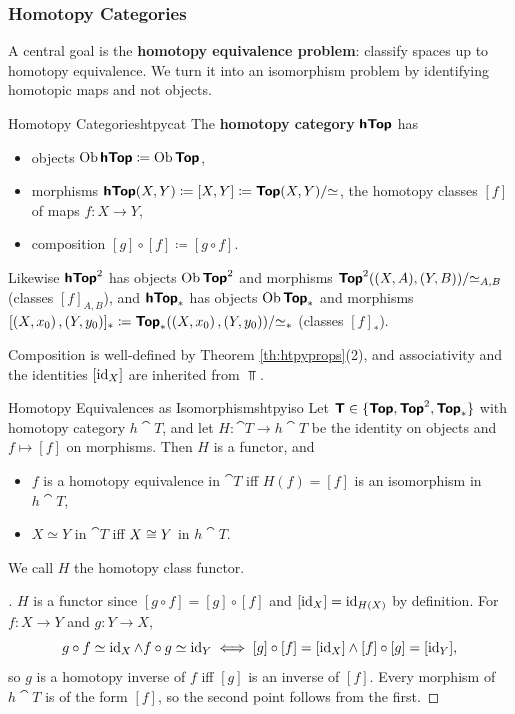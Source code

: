 \newpage

\subsubsection{Homotopy Categories}

A central goal is the \textbf{homotopy equivalence problem}: classify spaces up to homotopy equivalence. We turn it into an isomorphism problem by identifying homotopic maps and not objects.

\begin{definition}{Homotopy Categories}{htpycat}
  The \textbf{homotopy category} $\bm{\mathsf{hTop}}$ has
  \begin{itemize}
    \item objects $\operatorname{Ob}\bm{\mathsf{hTop}}\coloneqq\operatorname{Ob}\bm{\mathsf{Top}}$,
    \item morphisms $\bm{\mathsf{hTop}}(X,Y)\coloneqq[X,Y]\coloneqq\bm{\mathsf{Top}}(X,Y)/{\simeq}$, the homotopy classes $[f]$ of maps $f:X\to Y$,
    \item composition $[g]\circ[f]\coloneqq[g\circ f]$.
  \end{itemize}
  Likewise $\bm{\mathsf{hTop}}^{2}$ has objects $\operatorname{Ob}\bm{\mathsf{Top}}^{2}$ and morphisms $\bm{\mathsf{Top}}^{2}((X,A),(Y,B))/{\simeq_{A,B}}$ (classes $[f]_{A,B}$), and $\bm{\mathsf{hTop}}_*$ has objects $\operatorname{Ob}\bm{\mathsf{Top}}_*$ and morphisms $[\left(X,x_0\right),\left(Y,y_0\right)]_*\coloneqq\bm{\mathsf{Top}}_*(\left(X,x_0\right),\left(Y,y_0\right))/{\simeq_*}$ (classes $[f]_*$).
\end{definition}

Composition is well-defined by Theorem \ref{th:htpyprops}(2), and associativity and the identities $[\operatorname{id}_X]$ are inherited from $\Top$.

\begin{proposition}{Homotopy Equivalences as Isomorphisms}{htpyiso}
  Let $\bm{\mathsf{T}}\in\{\bm{\mathsf{Top}},\bm{\mathsf{Top}}^{2},\bm{\mathsf{Top}}_*\}$ with homotopy category $h\cat{T}$, and let $H:\cat{T}\to h\cat{T}$ be the identity on objects and $f\mapsto[f]$ on morphisms. Then $H$ is a functor, and
  \begin{itemize}
    \item $f$ is a homotopy equivalence in $\cat{T}$ iff $H(f)=[f]$ is an isomorphism in $h\cat{T}$,
    \item $X\simeq Y$ in $\cat{T}$ iff $X\cong Y$ in $h\cat{T}$.
  \end{itemize}
  We call $H$ the homotopy class functor.
\end{proposition}

\begin{proof}[]
  $H$ is a functor since $[g\circ f]=[g]\circ[f]$ and $[\operatorname{id}_X]=\operatorname{id}_{H(X)}$ by definition. For $f:X\to Y$ and $g:Y\to X$, \[
    g\circ f\simeq\operatorname{id}_X\land f\circ g\simeq\operatorname{id}_Y\iff[g]\circ[f]=[\operatorname{id}_X]\land[f]\circ[g]=[\operatorname{id}_Y],
  \]
  so $g$ is a homotopy inverse of $f$ iff $[g]$ is an inverse of $[f]$. Every morphism of $h\cat{T}$ is of the form $[f]$, so the second point follows from the first.
\end{proof}

